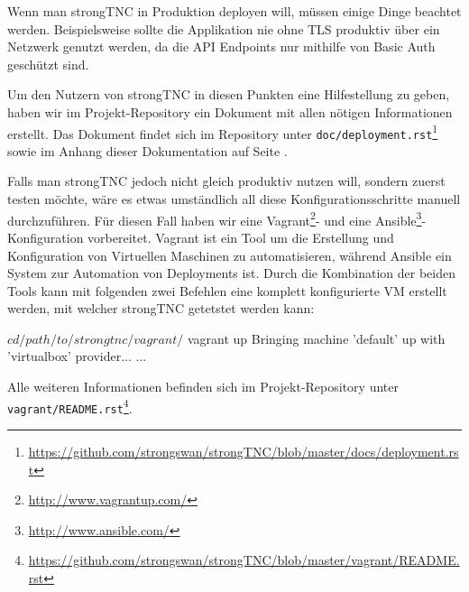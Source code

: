 Wenn man strongTNC in Produktion deployen will, müssen einige Dinge beachtet
werden. Beispielsweise sollte die Applikation nie ohne TLS produktiv über ein
Netzwerk genutzt werden, da die API Endpoints nur mithilfe von Basic Auth
geschützt sind.

Um den Nutzern von strongTNC in diesen Punkten eine Hilfestellung zu geben,
haben wir im Projekt-Repository ein Dokument mit allen nötigen Informationen
erstellt. Das Dokument findet sich im Repository unter
\texttt{doc/deployment.rst}\footnote{\url{https://github.com/strongswan/strongTNC/blob/master/docs/deployment.rst}}
sowie im Anhang dieser Dokumentation auf Seite
\pageref{anhang:deployment-manual}.

Falls man strongTNC jedoch nicht gleich produktiv nutzen will, sondern zuerst
testen möchte, wäre es etwas umständlich all diese Konfigurationsschritte
manuell durchzuführen. Für diesen Fall haben wir eine
Vagrant\footnote{\url{http://www.vagrantup.com/}}- und eine
Ansible\footnote{\url{http://www.ansible.com/}}-Konfiguration vorbereitet.
Vagrant ist ein Tool um die Erstellung und Konfiguration von Virtuellen
Maschinen zu automatisieren, während Ansible ein System zur Automation von
Deployments ist. Durch die Kombination der beiden Tools kann mit folgenden zwei
Befehlen eine komplett konfigurierte VM erstellt werden, mit welcher strongTNC
getetstet werden kann:

\begin{textcode}
$ cd /path/to/strongtnc/vagrant/
$ vagrant up
Bringing machine 'default' up with 'virtualbox' provider...
...
\end{textcode}

Alle weiteren Informationen befinden sich im Projekt-Repository unter
\texttt{vagrant/README.rst}\footnote{\url{https://github.com/strongswan/strongTNC/blob/master/vagrant/README.rst}}.

